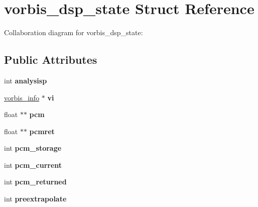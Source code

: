 \hypertarget{structvorbis__dsp__state}{\section{vorbis\+\_\+dsp\+\_\+state Struct Reference}
\label{structvorbis__dsp__state}
}


Collaboration diagram for vorbis\+\_\+dsp\+\_\+state\+:
\subsection*{Public Attributes}
\begin{DoxyCompactItemize}
\item 
\hypertarget{structvorbis__dsp__state_a9b983a6901a311f2d354f2b6c51cf93b}{int {\bfseries analysisp}}\label{structvorbis__dsp__state_a9b983a6901a311f2d354f2b6c51cf93b}

\item 
\hypertarget{structvorbis__dsp__state_ab6819a31e79031cdcd8f2ff40a5c1def}{\hyperlink{structvorbis__info}{vorbis\+\_\+info} $\ast$ {\bfseries vi}}\label{structvorbis__dsp__state_ab6819a31e79031cdcd8f2ff40a5c1def}

\item 
\hypertarget{structvorbis__dsp__state_ab33bafd2638e5bea5737709feea89027}{float $\ast$$\ast$ {\bfseries pcm}}\label{structvorbis__dsp__state_ab33bafd2638e5bea5737709feea89027}

\item 
\hypertarget{structvorbis__dsp__state_ab2c2a87593f0d7a3c867ba80102c4260}{float $\ast$$\ast$ {\bfseries pcmret}}\label{structvorbis__dsp__state_ab2c2a87593f0d7a3c867ba80102c4260}

\item 
\hypertarget{structvorbis__dsp__state_a33cf1637859094c31429dace6dfc79e2}{int {\bfseries pcm\+\_\+storage}}\label{structvorbis__dsp__state_a33cf1637859094c31429dace6dfc79e2}

\item 
\hypertarget{structvorbis__dsp__state_a6d09bbf3927e337d721b05f669bd70c6}{int {\bfseries pcm\+\_\+current}}\label{structvorbis__dsp__state_a6d09bbf3927e337d721b05f669bd70c6}

\item 
\hypertarget{structvorbis__dsp__state_a8db33e5f4c0b7f31f218c9ff6ccd7ac3}{int {\bfseries pcm\+\_\+returned}}\label{structvorbis__dsp__state_a8db33e5f4c0b7f31f218c9ff6ccd7ac3}

\item 
\hypertarget{structvorbis__dsp__state_aecc3c42d23d876c8bfd396b5c2ac5eb6}{int {\bfseries preextrapolate}}\label{structvorbis__dsp__state_aecc3c42d23d876c8bfd396b5c2ac5eb6}


\end{DoxyCompactItemize}
